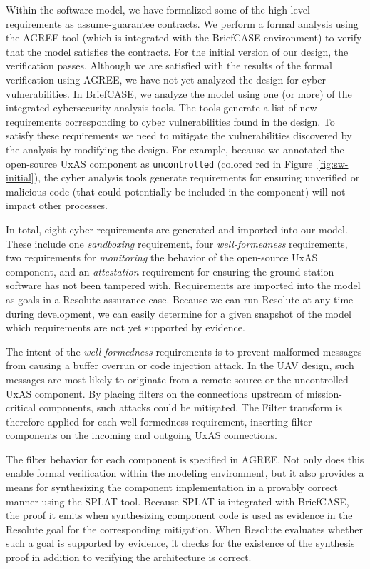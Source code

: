 Within the software model, we have formalized some of the high-level requirements as assume-guarantee contracts.  We perform a formal analysis using the AGREE tool (which is integrated with the BriefCASE environment) to verify that the model satisfies the contracts.  For the initial version of our design, the verification passes.
%
Although we are satisfied with the results of the formal verification using AGREE, we have not yet analyzed the design for cyber-vulnerabilities.  
In BriefCASE, we analyze the model using one (or more) of the integrated cybersecurity analysis tools.  The tools generate a list of new requirements corresponding to cyber vulnerabilities found in the design.  To satisfy these requirements we need to mitigate the vulnerabilities discovered by the analysis by modifying the design.
%
For example, because we annotated the open-source UxAS component as \texttt{uncontrolled} (colored red in Figure~\ref{fig:sw-initial}), the cyber analysis tools generate requirements for ensuring unverified or malicious code (that could potentially be included in the component) will not impact other processes. 

In total, eight cyber requirements are generated and imported into our model.  These include one \textit{sandboxing} requirement, four \textit{well-formedness} requirements, two requirements for \textit{monitoring} the behavior of the open-source UxAS component, and an \textit{attestation} requirement for ensuring the ground station software has not been tampered with.  Requirements are imported into the model as goals in a Resolute assurance case.  Because we can run Resolute at any time during development, we can easily determine for a given snapshot of the model which requirements are not yet supported by evidence.

The intent of the \textit{well-formedness} requirements is to prevent malformed messages from causing a buffer overrun or code injection attack.  In the UAV design, such messages are most likely to originate from a remote source or the uncontrolled UxAS component.  By placing filters on the connections upstream of mission-critical components, such attacks could be mitigated.  The Filter transform is therefore applied for each well-formedness requirement, inserting filter components on the incoming and outgoing UxAS connections.  

The filter behavior for each component is specified in AGREE.  Not only does this enable formal verification within the modeling environment, but it also provides a means for synthesizing the component implementation in a provably correct manner using the SPLAT tool.  Because SPLAT is integrated with BriefCASE, the proof it emits when synthesizing component code is used as evidence in the Resolute goal for the corresponding mitigation.  When Resolute evaluates whether such a goal is supported by evidence, it checks for the existence of the synthesis proof in addition to verifying the architecture is correct.  

